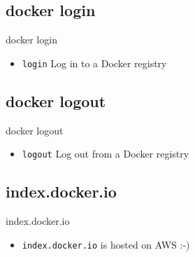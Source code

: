 \subsection{docker login}\label{subsec:docker-login}
\begin{frame}{docker login}
    \begin{itemize}
        \item \texttt{login} Log in to a Docker registry
        \pause
        
    \end{itemize}
\end{frame}

\subsection{docker logout}\label{subsec:docker-logout}
\begin{frame}{docker logout}
    \begin{itemize}
        \item \texttt{logout} Log out from a Docker registry
        \pause
        
    \end{itemize}
\end{frame}

\subsection{index.docker.io}\label{subsec:index.docker.io}
\begin{frame}{index.docker.io}
    \begin{itemize}
        \item \texttt{index.docker.io} is hosted on AWS :-)
        \pause
        
    \end{itemize}
\end{frame}
